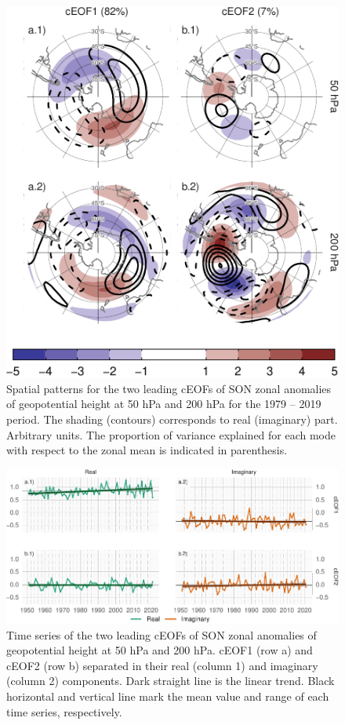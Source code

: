 \documentclass[smallextended]{svjour3}       %
\begin{document}
\begin{figure}
\centering
\includegraphics{../figures/ceofs-1-1.pdf}
\caption{\label{fig:ceofs-1}Spatial patterns for the two leading cEOFs of SON zonal anomalies of geopotential height at 50 hPa and 200 hPa for the 1979 -- 2019 period. The shading (contours) corresponds to real (imaginary) part. Arbitrary units. The proportion of variance explained for each mode with respect to the zonal mean is indicated in parenthesis.}
\end{figure}



\begin{figure}
\includegraphics{../figures/extended-series-1} \caption{Time series of the two leading cEOFs of SON zonal anomalies of geopotential height at 50 hPa and 200 hPa. cEOF1 (row a) and cEOF2 (row b) separated in their real (column 1) and imaginary (column 2) components. Dark straight line is the linear trend. Black horizontal and vertical line mark the mean value and range of each time series, respectively.}\label{fig:extended-series}
\end{figure}
\end{document}
